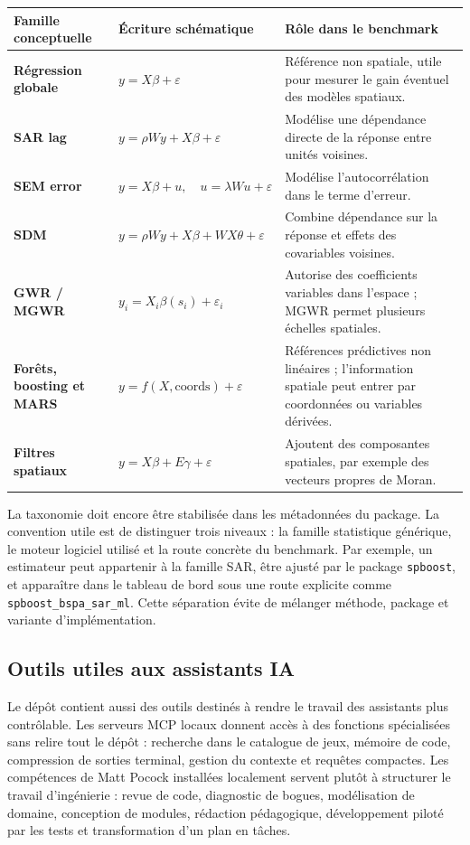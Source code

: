\documentclass[11pt,a4paper]{article}
\begin{document}
\begin{center}
\scriptsize
\begin{tabularx}{\textwidth}{>{\bfseries}p{2.7cm}p{4.0cm}X}
\toprule
Famille conceptuelle & Écriture schématique & Rôle dans le benchmark \\
\midrule
Régression globale & $y = X\beta + \varepsilon$ & Référence non spatiale, utile pour mesurer le gain éventuel des modèles spatiaux. \\
SAR lag & $y = \rho Wy + X\beta + \varepsilon$ & Modélise une dépendance directe de la réponse entre unités voisines. \\
SEM error & $y = X\beta + u,\quad u=\lambda Wu+\varepsilon$ & Modélise l'autocorrélation dans le terme d'erreur. \\
SDM & $y = \rho Wy + X\beta + WX\theta + \varepsilon$ & Combine dépendance sur la réponse et effets des covariables voisines. \\
GWR / MGWR & $y_i = X_i\beta(s_i)+\varepsilon_i$ & Autorise des coefficients variables dans l'espace ; MGWR permet plusieurs échelles spatiales. \\
Forêts, boosting et MARS & $y = f(X,\mathrm{coords})+\varepsilon$ & Références prédictives non linéaires ; l'information spatiale peut entrer par coordonnées ou variables dérivées. \\
Filtres spatiaux & $y = X\beta + E\gamma + \varepsilon$ & Ajoutent des composantes spatiales, par exemple des vecteurs propres de Moran. \\
\bottomrule
\end{tabularx}
\end{center}

La taxonomie doit encore être stabilisée dans les métadonnées du package. La convention utile est de distinguer trois niveaux : la famille statistique générique, le moteur logiciel utilisé et la route concrète du benchmark. Par exemple, un estimateur peut appartenir à la famille SAR, être ajusté par le package \texttt{spboost}, et apparaître dans le tableau de bord sous une route explicite comme \texttt{spboost\_bspa\_sar\_ml}. Cette séparation évite de mélanger méthode, package et variante d'implémentation.

\subsection{Outils utiles aux assistants IA}

Le dépôt contient aussi des outils destinés à rendre le travail des assistants plus contrôlable. Les serveurs MCP locaux donnent accès à des fonctions spécialisées sans relire tout le dépôt : recherche dans le catalogue de jeux, mémoire de code, compression de sorties terminal, gestion du contexte et requêtes compactes. Les compétences de Matt Pocock installées localement servent plutôt à structurer le travail d'ingénierie : revue de code, diagnostic de bogues, modélisation de domaine, conception de modules, rédaction pédagogique, développement piloté par les tests et transformation d'un plan en tâches.
\end{document}
